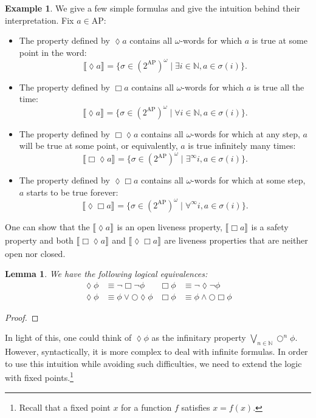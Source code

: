 \documentclass{tufte-handout} %
\newtheorem{lem}[thm]{Lemma}
\theoremstyle{definition}
\newtheorem{exmp}[thm]{Example}
\theoremstyle{remark}
\newcommand{\N}{\mathbb{N}}
\newcommand{\0}{\textsf{0}}
\newcommand{\1}{\textsf{1}}
\newcommand{\AP}{\text{AP}}
\newcommand{\sem}[2]{\llbracket #1 \rrbracket_{#2}}
\begin{document}
\begin{exmp}
	We give a few simple formulas and give the intuition behind  their interpretation. Fix $a \in \AP$:
	\begin{itemize}
		\item The property defined by $\lozenge a$ contains all $\omega$-words for which $a$ is true at some point in the word: \[\sem{\lozenge a}{} = \{ \sigma \in (2^{\AP})^{\omega} \mid \exists i \in \N, a \in \sigma(i)\}.\] 
		\item The property defined by $\Box a$ contains all $\omega$-words for which $a$ is true all the time: \[\sem{\lozenge a}{} = \{ \sigma \in (2^{\AP})^{\omega} \mid \forall i \in \N, a \in \sigma(i)\}.\]
		
		\item The property defined by $\Box \lozenge a$ contains all $\omega$-words for which at any step, $a$ will be true at some point, or equivalently, $a$ is true infinitely many times:\[\sem{\Box \lozenge a}{} = \{ \sigma \in (2^{\AP})^{\omega} \mid \exists^{\infty} i, a \in \sigma(i)\}.\]
		
		\item The property defined by $\lozenge\Box a$ contains all $\omega$-words for which at some step, $a$ starts to be true forever: \[\sem{\lozenge \Box a}{} = \{ \sigma \in (2^{\AP})^{\omega} \mid \forall^{\infty} i, a \in \sigma(i)\}.\]
	\end{itemize}
	One can show that the $\sem{\lozenge a}{}$ is an open liveness property, $\sem{\Box a}{}$ is a safety property and both $\sem{\Box \lozenge a}{}$ and $\sem{\lozenge \Box a}{}$ are liveness properties that are neither open nor closed.
\end{exmp}
\begin{lem}\label{lem-equivmodal}
	We have the following logical equivalences:
	\begin{align*}
		\lozenge \phi &\equiv \neg \Box \neg \phi &\Box \phi &\equiv \neg \lozenge \neg \phi\\
		\lozenge \phi &\equiv \phi \vee \bigcirc\lozenge \phi &\Box\phi &\equiv \phi \wedge \bigcirc \Box\phi
	\end{align*}
\end{lem}
\begin{proof}
\end{proof}
In light of this, one could think of $\lozenge \phi$ as the infinitary property $\bigvee_{n \in \N} \bigcirc^n \phi$. However, syntactically, it is more complex to deal with infinite formulas. In order to use this intuition while avoiding such difficulties, we need to extend the logic with fixed points.\footnote{Recall that a fixed point $x$ for a function $f$ satisfies $x = f(x)$.}
\end{document}
